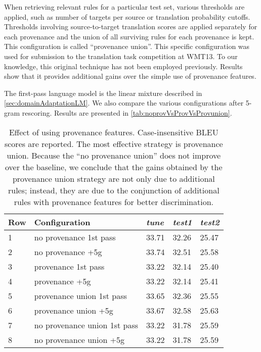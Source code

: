 When retrieving relevant rules for a particular test set, various thresholds are applied, such %
as number of targets per source or translation probability cutoffs.
Thresholds involving source-to-target translation scores are applied separately for each
provenance and the union of all surviving rules for each provenance is kept. This 
configuration is called ``provenance union''. This specific configuration
was used for submission to the translation task competition at WMT13.
To our knowledge, this original technique has not been employed previously.
Results show that it provides additional gains over the simple use
of provenance features.

The first-pass language model is the linear mixture described
in \autoref{sec:domainAdaptationLM}. We also compare
the various configurations after 5-gram rescoring.
Results are presented in \autoref{tab:noprovVsProvVsProvunion}.
%
\begin{table}
  \begin{center}
    \begin{tabular}{l|l|lll}
      Row & Configuration & \emph{tune} & \emph{test1} & \emph{test2} \\
      \hline
      1 & no provenance 1st pass & 33.71 & 32.26 & 25.47 \\
      2 & no provenance +5g           & 33.74 & 32.51 & 25.58 \\
      \hline
      3 & provenance 1st pass & 33.22 & 32.14 & 25.40 \\
      4 & provenance +5g        & 33.22 & 32.14 & 25.41 \\
      \hline
      5 & provenance union 1st pass & 33.65 & 32.36 & 25.55 \\
      6 & provenance union +5g              & 33.67 & 32.58 & 25.63 \\
      \hline
      7 & no provenance union 1st pass & 33.22 & 31.78 & 25.59 \\
      8 & no provenance union +5g      & 33.22 & 31.78 & 25.59 \\
    \end{tabular}
    \caption{Effect of using provenance features. Case-insensitive
      BLEU scores are reported. The most effective strategy is
      provenance union. Because the ``no provenance union'' does
      not improve over the baseline, we conclude that the gains
      obtained by the provenance union strategy are not only due
      to additional rules; instead, they are due to the conjunction
      of additional rules with provenance features for better discrimination.}
    \label{tab:noprovVsProvVsProvunion}
  \end{center}
\end{table}
